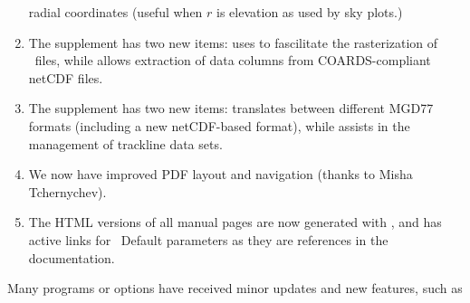 \begin{enumerate}
radial coordinates (useful when $r$ is elevation as used by sky plots.)
\item The  supplement has two new items:  uses  to
fascilitate the rasterization of \PS\ files, while  allows extraction of data columns from
COARDS-compliant netCDF files.
\item The  supplement has two new items:  translates between different
MGD77 formats (including a new netCDF-based format), while  assists in the management
of trackline data sets.
\item We now have improved PDF layout and navigation (thanks to Misha Tchernychev).
\item The HTML versions of all manual pages are now generated with , and has active links
for \GMT\ Default parameters as they are references in the documentation.
\end{enumerate}

Many programs or options have received minor updates and new features, such as

